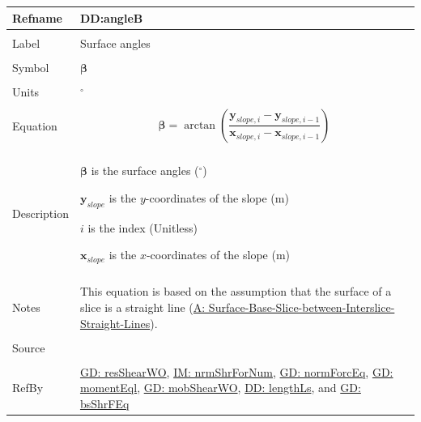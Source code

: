 \documentclass[12pt]{article}
\begin{document}
\vspace{\baselineskip}
\noindent
\begin{minipage}{\textwidth}
\begin{tabular}{>{\raggedright}p{}>{\raggedright\arraybackslash}p{}}
\toprule \textbf{Refname} & \textbf{DD:angleB}
\label{DD:angleB}
\\ \midrule \\
Label & Surface angles
        
\\ \midrule \\
Symbol & $\mathbf{β}$
         
\\ \midrule \\
Units & ${}^{\circ}$
        
\\ \midrule \\
Equation & \begin{displaymath}
           \mathbf{β}=\arctan\left(\frac{{\mathbf{y}_{slope,i}}-{\mathbf{y}_{slope,i-1}}}{{\mathbf{x}_{slope,i}}-{\mathbf{x}_{slope,i-1}}}\right)
           \end{displaymath}
\\ \midrule \\
Description & \begin{symbDescription}
              \item{$\mathbf{β}$ is the surface angles (${}^{\circ}$)}
              \item{${\mathbf{y}_{slope}}$ is the $y$-coordinates of the slope (m)}
              \item{$i$ is the index (Unitless)}
              \item{${\mathbf{x}_{slope}}$ is the $x$-coordinates of the slope (m)}
              \end{symbDescription}
\\ \midrule \\
Notes & This equation is based on the assumption that the surface of a slice is a straight line (\hyperref[assumpSBSBISL]{A: Surface-Base-Slice-between-Interslice-Straight-Lines}).
        
\\ \midrule \\
Source & \cite{fredlund1977}
         
\\ \midrule \\
RefBy & \hyperref[GD:resShearWO]{GD: resShearWO}, \hyperref[IM:nrmShrForNum]{IM: nrmShrForNum}, \hyperref[GD:normForcEq]{GD: normForcEq}, \hyperref[GD:momentEql]{GD: momentEql}, \hyperref[GD:mobShearWO]{GD: mobShearWO}, \hyperref[DD:lengthLs]{DD: lengthLs}, and \hyperref[GD:bsShrFEq]{GD: bsShrFEq}
        
\\ \bottomrule
\end{tabular}
\end{minipage}
\end{document}
